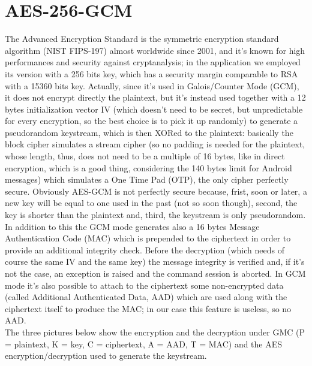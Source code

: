 \section{AES-256-GCM}
\small{The Advanced Encryption Standard is the symmetric encryption standard algorithm (NIST FIPS-197) almost worldwide since 2001, and it's known for high performances and security against cryptanalysis; in the application we employed its version with a 256 bits key, which has a security margin comparable to RSA with a 15360 bits key. Actually, since it's used in Galois/Counter Mode (GCM), it does not encrypt directly the plaintext, but it's instead used together with a 12 bytes initialization vector IV (which doesn't need to be secret, but unpredictable for every encryption, so the best choice is to pick it up randomly) to generate a pseudorandom keystream, which is then XORed to the plaintext: basically the block cipher simulates a stream cipher (so no padding is needed for the plaintext, whose length, thus, does not need to be a multiple of 16 bytes, like in direct encryption, which is a good thing, considering the 140 bytes limit for Android messages) which simulates a One Time Pad (OTP), the only cipher perfectly secure. Obviously AES-GCM is not perfectly secure because, frist, soon or later, a new key will be equal to one used in the past (not so soon though), second, the key is shorter than the plaintext and, third, the keystream is only pseudorandom. In addition to this the GCM mode generates also a 16 bytes Message Authentication Code (MAC) which is prepended to the ciphertext in order to provide an additional integrity check. Before the decryption (which needs of course the same IV and the same key) the message integrity is verified and, if it's not the case, an exception is raised and the command session is aborted. In GCM mode it's also possible to attach to the ciphertext some non-encrypted data (called Additional Authenticated Data, AAD) which are used along with the ciphertext itself to produce the MAC; in our case this feature is useless, so no AAD.\\The three pictures below show the encryption and the decryption under GMC (P = plaintext, K = key, C = ciphertext, A = AAD, T = MAC) and the AES encryption/decryption used to generate the keystream.}\\

